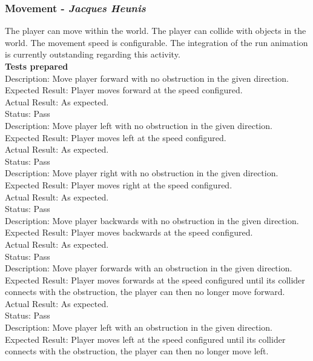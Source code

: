 \documentclass[a4paper,10pt]{article}
\begin{document}
\subsubsection{Movement - \textit{Jacques Heunis}}
The player can move within the world. The player can collide with objects in the world. The movement speed is configurable. The integration of the run animation is currently outstanding regarding this activity.
\smallskip\\\textbf{Tests prepared}\\
Description: Move player forward with no obstruction in the given direction.\\
Expected Result: Player moves forward at the speed configured.\\
Actual Result: As expected.\\
Status: Pass
\smallskip\\
Description: Move player left with no obstruction in the given direction.\\
Expected Result: Player moves left at the speed configured.\\
Actual Result: As expected.\\
Status: Pass
\smallskip\\
Description: Move player right with no obstruction in the given direction.\\
Expected Result: Player moves right at the speed configured.\\
Actual Result: As expected.\\
Status: Pass
\smallskip\\
Description: Move player backwards with no obstruction in the given direction.\\
Expected Result: Player moves backwards at the speed configured.\\
Actual Result: As expected.\\
Status: Pass
\smallskip\\
Description: Move player forwards with an obstruction in the given direction.\\
Expected Result: Player moves forwards at the speed configured until its collider connects with the obstruction, the player can then no longer move forward.\\
Actual Result: As expected.\\
Status: Pass
\smallskip\\
Description: Move player left with an obstruction in the given direction.\\
Expected Result: Player moves left at the speed configured until its collider connects with the obstruction, the player can then no longer move left.\\
\end{document}
